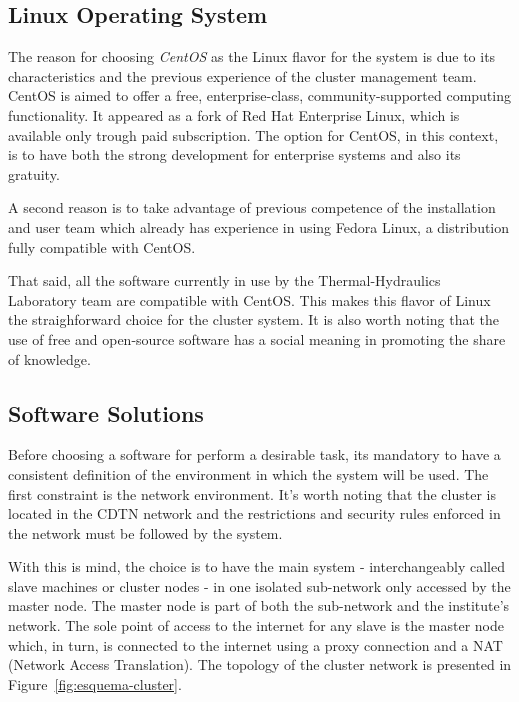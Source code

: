 \documentclass[twoside,a4paper,12pt,english]{inac17}
\begin{document}
\subsection{Linux Operating System}

The reason for choosing \textit{CentOS} as the Linux flavor for the system is due to its characteristics and the previous
experience of the cluster management team. CentOS is aimed to offer a free, enterprise-class, community-supported computing
functionality. It appeared as a fork of Red Hat Enterprise Linux, which is available only trough paid subscription. The option
for CentOS, in this context, is to have both the strong development for enterprise systems and also its gratuity.

A second reason is to take advantage of previous competence of the installation and user team which already has experience
in using Fedora Linux, a distribution fully compatible with CentOS.

That said, all the software currently in use by the Thermal-Hydraulics Laboratory team are compatible with CentOS. This
makes this flavor of Linux the straighforward choice for the cluster system. It is also worth noting that the use of
free and open-source software has a social meaning in promoting the share of knowledge.

\subsection{Software Solutions}
\label{sub:ssol}

Before choosing a software for perform a desirable task, its mandatory to have a consistent definition of the environment
in which the system will be used. The first constraint is the network environment. It's worth noting that the cluster is
located in the CDTN network and the restrictions and security rules enforced in the network must be followed by the system.

With this is mind, the choice is to have the main system - interchangeably called slave machines or cluster nodes - in one isolated sub-network only accessed by
the master node. The master node is part of both the sub-network and the institute's network. The sole point of access to the
internet for any slave is the master node which, in turn, is connected to the internet using a proxy connection and a
NAT (Network Access Translation). The topology of the cluster network is presented in Figure~\ref{fig:esquema-cluster}.
\end{document}
